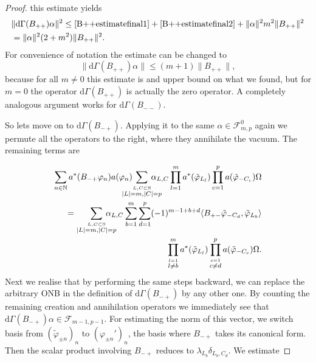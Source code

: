 \documentclass[b5paper,draft,openbib,12pt]{memoir}
\begin{document}
\begin{proof}
this estimate yields
\begin{align}\nonumber
&\|\mathrm{d}\Gamma(B_{++})\alpha\|^2 \le \eqref{B++estimatefinal1}+\eqref{B++estimatefinal2} + \|\alpha\|^2 m^2 \|B_{++}\|^2 \\\nonumber
&= \|\alpha\|^2 (2+m^2) \|B_{++}\|^2.
\end{align}
For convenience of notation the estimate can be changed to 
\begin{equation}
\|\mathrm{d}\Gamma(B_{++})\alpha\| \le (m+1) \|B_{++}\|,
\end{equation}
because for all \(m\neq0\) 
this estimate is and upper bound on what we found, but for \(m=0\) the operator \(\mathrm{d}\Gamma(B_{++})\) is actually the zero operator.
A completely analogous argument works for \(\mathrm{d}\Gamma(B_{--})\). 

So lets move on to \(\mathrm{d}\Gamma(B_{-+})\). Applying it to the same \(\alpha\in \mathcal{F}^0_{m,p}\) again we permute all the operators
to the right, where they annihilate the vacuum. The remaining terms are

\begin{align}\nonumber
\sum_{n\in\mathbb{N}} a^*(B_{-+}\varphi_n)a(\varphi_{n})\hspace{-0.5cm}\sum_{\overset{L,C\subset \mathbb{N}}{|L|=m,|C|=p}}  \hspace{-0.5cm}\alpha_{L,C} 
\prod_{l=1}^m a^*(\tilde{\varphi}_{L_l}) \prod_{c=1}^p a(\tilde{\varphi}_{-C_c}) \Omega  \\\nonumber
=\sum_{\overset{L,C\subset \mathbb{N}}{|L|=m,|C|=p}}\hspace{-0.5cm} \alpha_{L,C} \sum_{b=1}^m \sum_{d=1}^p (-1)^{m-1+b+d} \langle B_{+-} \tilde{\varphi}_{-C_d},\tilde{\varphi}_{L_b}\rangle \\
\prod_{\overset{l=1}{l\neq b}}^m a^*(\tilde{\varphi}_{L_l})
\prod_{\overset{c=1}{c\neq d}}^p a(\tilde{\varphi}_{-C_c})\Omega.
\end{align}
Next we realise that by performing the same steps backward, we can replace the arbitrary ONB in the definition of \(\mathrm{d}\Gamma(B_{-+})\) by any other one.
By counting the remaining creation and annihilation operators we immediately see that \(\mathrm{d}\Gamma(B_{-+})\alpha\in \mathcal{F}_{m-1,p-1}\). 
For estimating the norm of this vector, we switch basis from \((\tilde{\varphi}_{\pm n})_n\) to \((\varphi_{\pm n}')_n\), the basis where 
\(B_{-+}\) takes its canonical form. Then the scalar product involving \(B_{-+}\) reduces to \(\lambda_{L_b}\delta_{L_b,C_d}\). We estimate


\end{proof}
\end{document}
